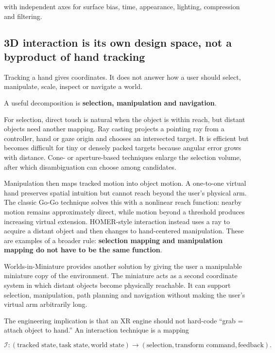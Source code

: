 with independent axes for surface bias, time, appearance, lighting, compression and filtering.

\subsection{3D interaction is its own design space, not a byproduct of hand tracking}\label{d-interaction-is-its-own-design-space-not-a-byproduct-of-hand-tracking}

Tracking a hand gives coordinates. It does not answer how a user should select, manipulate, scale, inspect or navigate a world.

A useful decomposition is \textbf{selection, manipulation and navigation}.

For selection, direct touch is natural when the object is within reach, but distant objects need another mapping. Ray casting projects a pointing ray from a controller, hand or gaze origin and chooses an intersected target. It is efficient but becomes difficult for tiny or densely packed targets because angular error grows with distance. Cone- or aperture-based techniques enlarge the selection volume, after which disambiguation can choose among candidates.

Manipulation then maps tracked motion into object motion. A one-to-one virtual hand preserves spatial intuition but cannot reach beyond the user's physical arm. The classic Go-Go technique solves this with a nonlinear reach function: nearby motion remains approximately direct, while motion beyond a threshold produces increasing virtual extension. HOMER-style interaction instead uses a ray to acquire a distant object and then changes to hand-centered manipulation. These are examples of a broader rule: \textbf{selection mapping and manipulation mapping do not have to be the same function}.

Worlds-in-Miniature provides another solution by giving the user a manipulable miniature copy of the environment. The miniature acts as a second coordinate system in which distant objects become physically reachable. It can support selection, manipulation, path planning and navigation without making the user's virtual arm arbitrarily long.

The engineering implication is that an XR engine should not hard-code ``grab = attach object to hand.'' An interaction technique is a mapping

\[
\mathcal I:
(\text{tracked state},\text{task state},\text{world state})
\rightarrow
(\text{selection},\text{transform command},\text{feedback}).
\]

